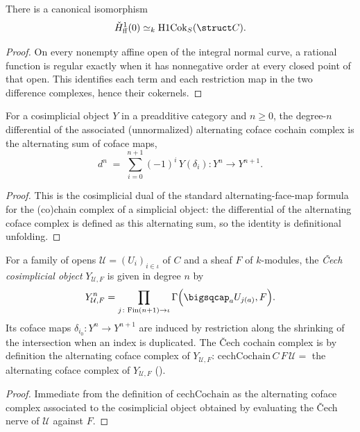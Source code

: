 \begin{proposition}
  \label{thm:adelic_function_field_H1_zero_compare}
  There is a canonical isomorphism
  \[
    \check H^1_{\mathrm{ff}}(0)
      \simeq_k\operatorname{H1Cok}_S(\struct C).
  \]
\end{proposition}
\begin{proof}
  On every nonempty affine open of the integral normal curve, a rational
  function is regular exactly when it has nonnegative order at every
  closed point of that open.  This identifies each term and each
  restriction map in the two difference complexes, hence their cokernels.
\end{proof}

\begin{lemma}
  \label{lem:adelic_alternatingCofaceMapComplex_objD}
  \leanok
  For a cosimplicial object \(Y\) in a preadditive category and \(n \ge
  0\), the degree-\(n\) differential of the associated (unnormalized)
  alternating coface cochain complex is the alternating sum of coface
  maps,
  \[
    d^n \;=\; \sum_{i = 0}^{n+1} (-1)^i\, Y(\delta_i) \colon Y^n \to
    Y^{n+1}.
  \]
\end{lemma}
\begin{proof}
  \leanok
  This is the cosimplicial dual of the standard alternating-face-map
  formula for the (co)chain complex of a simplicial object: the
  differential of the alternating coface complex is defined as this
  alternating sum, so the identity is definitional unfolding.
\end{proof}

\begin{definition}
  \label{def:adelic_cechCosimplicial}
  \leanok
  For a family of opens \(\mathcal{U} = (U_i)_{i \in \iota}\) of \(C\)
  and a sheaf \(F\) of \(k\)-modules, the \emph{Čech cosimplicial object}
  \(Y_{\mathcal{U}, F}\) is given in degree \(n\) by
  \[
    Y_{\mathcal U,F}^n=
      \prod_{j \colon \mathrm{Fin}(n+1) \to \iota}
        \Gamma\Bigl(\bigsqcap_a U_{j(a)},F\Bigr).
  \]
  Its coface maps \(\delta_{i_0} \colon Y^n \to Y^{n+1}\) are induced by
  restriction along the shrinking of the
  intersection when an index is duplicated. The Čech cochain complex is
  by definition the alternating coface complex of \(Y_{\mathcal{U},
  F}\):
  \(\mathrm{cechCochain}\, C\, F\, \mathcal{U} =\) the alternating coface
  complex of \(Y_{\mathcal{U}, F}\)
  ().
\end{definition}
\begin{proof}
  \leanok
  Immediate from the definition of \(\mathrm{cechCochain}\) as the
  alternating coface complex associated to the cosimplicial object
  obtained by evaluating the Čech nerve of \(\mathcal{U}\) against \(F\).
\end{proof}

